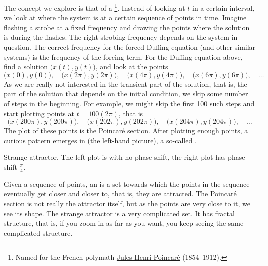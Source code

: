 \documentclass{ximera}
\begin{document}
The concept we explore is that of a \emph{}%
\footnote{Named for the French polymath \href{https://en.wikipedia.org/wiki/Henri_Poincar\%C3\%A9}{Jules Henri Poincar\'e} (1854--1912).}.
Instead of looking at $t$ in a certain interval, we look at where the system is at a certain sequence of points in time. Imagine flashing a strobe at a fixed frequency and drawing the points where the solution is during the flashes. The right strobing frequency depends on the system in question. The correct frequency for the forced Duffing equation (and other similar systems) is the frequency of the forcing term. For the Duffing equation above, find a solution $\bigl(x(t),y(t)\bigr)$, and look at the points
\begin{equation*}
    \bigl(x(0),y(0)\bigr), \quad \bigl(x(2\pi),y(2\pi)\bigr), \quad \bigl(x(4\pi),y(4\pi)\bigr), \quad \bigl(x(6\pi),y(6\pi)\bigr), \quad \ldots
\end{equation*}
As we are really not interested in the transient part of the solution, that is, the part of the solution that depends on the initial condition, we skip some number of steps in the beginning.  For example, we might skip the first 100 such steps and start plotting points at $t = 100(2\pi)$, that is
\begin{equation*}
    \bigl(x(200\pi),y(200\pi)\bigr), \quad \bigl(x(202\pi),y(202\pi)\bigr), \quad \bigl(x(204\pi),y(204\pi)\bigr), \quad \ldots
\end{equation*}
The plot of these points is the Poincar\'e section. After plotting enough points, a curious pattern emerges in  (the left-hand picture), a so-called \emph{}.

\begin{myfig}
    \capstart
    \caption{Strange attractor.  The left plot is with no phase shift, the right plot has phase shift $\frac{\pi}{4}$. \label{nlin:strange}}
\end{myfig}

Given a sequence of points, an \emph{} is a set towards which the points in the sequence eventually get closer and closer to, that is, they are attracted.  The Poincar\'e section is not really the attractor itself, but as the points are very close to it, we see its shape.  The strange attractor is a very complicated set.   It has fractal structure, that is, if you zoom in as far as you want, you keep seeing the same complicated structure.
\end{document}
